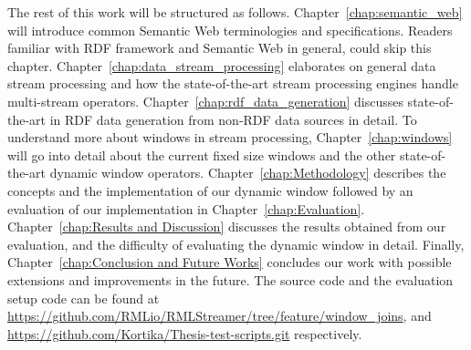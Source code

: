The rest of this work will be structured as follows. Chapter~\ref{chap:semantic_web} will 
introduce common Semantic Web terminologies and specifications. Readers familiar
with RDF framework and Semantic Web in general, could skip this chapter. 
Chapter~\ref{chap:data_stream_processing} elaborates on general data stream processing 
and how the state-of-the-art stream processing engines handle multi-stream operators. 
Chapter~\ref{chap:rdf_data_generation} discusses state-of-the-art in 
RDF data generation from non-RDF data sources in detail. 
To understand more about windows in stream processing, Chapter~\ref{chap:windows}
will go into detail about the current fixed size windows and the other state-of-the-art 
dynamic window operators. Chapter~\ref{chap:Methodology} describes the concepts and the 
implementation of our dynamic window followed by an evaluation of our implementation in 
Chapter~\ref{chap:Evaluation}. Chapter~\ref{chap:Results and Discussion} discusses the results 
obtained from our evaluation, and the difficulty of evaluating the dynamic window in detail. 
Finally, Chapter~\ref{chap:Conclusion and Future Works} concludes our work with possible extensions and 
improvements in the future. 
The source code and the evaluation setup code can be found at
\url{https://github.com/RMLio/RMLStreamer/tree/feature/window_joins}, and 
\href{https://github.com/Kortika/Thesis-test-scripts.git}{https://github.com/Kortika/Thesis-test-scripts.git} respectively.
